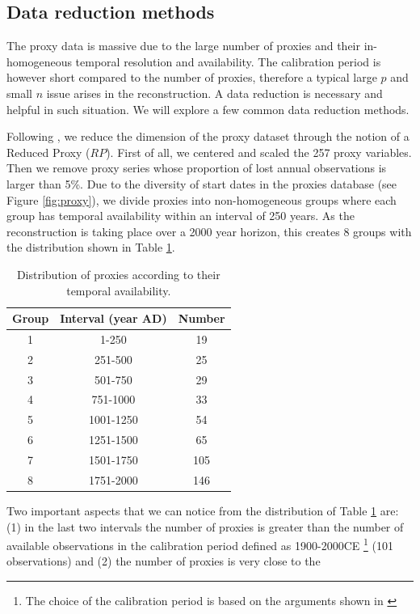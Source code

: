 \documentclass[11pt]{amsart}
\theoremstyle{plain}
\theoremstyle{definition}
\theoremstyle{remark}
\begin{document}
\subsection{Data reduction methods}
\label{sec:rp}

The proxy data is massive due to the large number of proxies and their in-homogeneous temporal resolution and availability. The calibration period is however short compared to the number of proxies, therefore a typical large $p$ and small $n$ issue arises in the reconstruction. A data reduction is necessary and helpful in such situation. We will explore a few common data reduction methods.    

Following \cite{Barboza2014}, we reduce the dimension of the proxy dataset
through the notion of a Reduced Proxy ($RP$). First of all, we centered and
scaled the 257 proxy variables. Then we remove proxy series whose proportion of lost
annual 
observations is larger than 5\%. Due to the diversity of start
dates in the proxies database (see Figure \ref{fig:proxy}), we divide
proxies into non-homogeneous groups where each group has temporal availability within an
interval of 250 years. As the reconstruction is taking place over a 2000 year
horizon, this creates 8 groups with the distribution shown in Table \ref{tab:distdate}.
\begin{table}
  \centering
  \begin{tabular}{c|c|c}
    \toprule
    Group & Interval (year AD) & Number \\
    \midrule
    1 & 1-250 & 19 \\
    2 & 251-500 & 25 \\
    3 & 501-750 & 29 \\
    4 & 751-1000 & 33 \\
    5 & 1001-1250 & 54 \\
    6 & 1251-1500 & 65 \\
    7 & 1501-1750 & 105 \\
    8 & 1751-2000 & 146 \\
    \bottomrule
  \end{tabular}
  \caption{Distribution of proxies according to their temporal availability.}
  \label{tab:distdate}
\end{table}
Two important aspects that we can notice from the distribution of Table
\ref{tab:distdate} are: (1) in the last two intervals the number of proxies is greater than
the number of available observations in the calibration period defined as
1900-2000CE \footnote{The choice of the calibration period is based on the
  arguments shown in \cite{Barboza2014}} (101 observations) and (2) the number of proxies is very close to the
\end{document}
